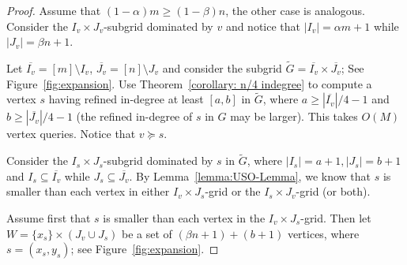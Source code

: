 \documentclass[a4paper,10pt]{article}
\newcommand{\indegree}{refined in-degree\xspace}
\begin{document}
\begin{proof}
Assume that $(1-\alpha) m \geq (1-\beta)n$, the other case is analogous. Consider the  $I_v\times J_v$-subgrid dominated by $v$ and 
notice that $|I_v| = \alpha m + 1$ while $|J_v| = \beta n + 1$. 

Let $\overline{I_v} = [m]\setminus I_v$, $\overline{J_v} = [n]\setminus J_v$ and consider the subgrid $\widetilde{G} = \overline{I_v} \times \overline{J_v}$; See Figure~\ref{fig:expansion}. Use Theorem~\ref{corollary: n/4 indegree} to compute a vertex $s$ having \indegree at least $[a,b]$ in $\widetilde{G}$, where $a \geq |\overline{I_v}|/4 - 1$ and $b \geq |\overline{J_v}|/4 - 1$ (the \indegree of $s$ in $G$ may be larger).
This takes $O(M)$ vertex queries. Notice that $v \succeq s$.

Consider the $I_{s}\times J_{s}$-subgrid dominated by $s$ in $\widetilde{G}$, where $|I_{s}| = a + 1, |J_{s}| = b + 1$ and $I_{s}\subseteq \overline{I_v}$ while $J_{s}\subseteq \overline{J_v}$. By Lemma~\ref{lemma:USO-Lemma}, we know that $s$ is smaller than each vertex in either $I_v\times J_{s}$-grid or the $I_{s}\times J_v$-grid (or both). 

Assume first that $s$ is smaller than each vertex in the $I_v\times J_{s}$-grid. Then let $W =  \{x_{s}\} \times (J_v\cup J_{s})$ be a set of $(\beta n + 1) + (b + 1)$ vertices, where $s = (x_{s}, y_{s})$; see Figure~\ref{fig:expansion}. 


\end{proof}
\end{document}
